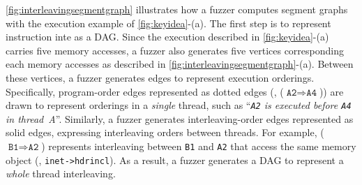 %



%
%
\autoref{fig:interleavingsegmentgraph} illustrates how a fuzzer 
computes segment graphs with the execution example of
\autoref{fig:keyidea}-(a).
%
The first step is to represent instruction inte as a DAG. Since the
execution described in \autoref{fig:keyidea}-(a) carries five memory
accesses, a fuzzer also generates five vertices corresponding each
memory accesses as described in
\autoref{fig:interleavingsegmentgraph}-(a).
%
Between these vertices, a fuzzer generates edges to represent
execution orderings. Specifically, program-order edges represented as
dotted edges (\eg, ($\texttt{A2} \Rightarrow \texttt{A4}$)) are drawn
to represent orderings in a \textit{single} thread, such as
``\textit{\texttt{A2} is executed before \texttt{A4} in thread~A}''.
%
Similarly, a fuzzer generates interleaving-order edges represented as
solid edges, expressing interleaving orders between threads. For
example, ($\texttt{B1} \Rightarrow \texttt{A2}$) represents
interleaving between \texttt{B1} and \texttt{A2} that access the same
memory object (\ie, \texttt{inet->hdrincl}).
%
As a result, a fuzzer generates a DAG to represent a \textit{whole}
thread interleaving.



